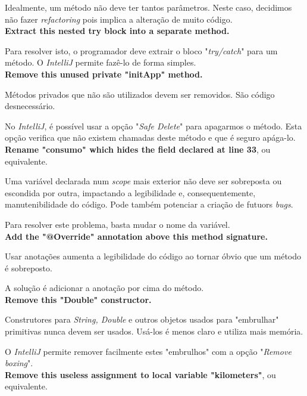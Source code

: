 \documentclass[a4paper]{report}
\begin{document}
\begin{itemize}
    Idealmente, um método não deve ter tantos parâmetros.
    Neste caso, decidimos não fazer \textit{refactoring} pois implica a alteração de muito código. \\
    
    \textbf{Extract this nested try block into a separate method.}
    
    Para resolver isto, o programador deve extrair o bloco "\textit{try/catch}" para um método. O \textit{IntelliJ} permite fazê-lo de forma simples. \\

    
    \textbf{Remove this unused private "initApp" method.}
    
    Métodos privados que não são utilizados devem ser removidos. São código desnecessário.
    
    No \textit{IntelliJ}, é possível usar a opção "\textit{Safe Delete}" para apagarmos o método. Esta opção verifica que não existem chamadas deste método e que é seguro apága-lo. \\
    
    \textbf{Rename "consumo" which hides the field declared at line 33}, ou equivalente.
    
    Uma variável declarada num \textit{scope} mais exterior não deve ser sobreposta ou escondida por outra, impactando a legibilidade e, consequentemente, manutenibilidade do código. Pode também potenciar a criação de futuors \textit{bugs}.
    
    Para resolver este problema, basta mudar o nome da variável.\\
    
    
    \textbf{Add the "@Override" annotation above this method signature.}

    Usar anotações aumenta a legibilidade do código ao tornar óbvio que um método é sobreposto.

    A solução é adicionar a anotação por cima do método. \\


    \textbf{Remove this "Double" constructor.}

    Construtores para \textit{String, Double} e outros objetos usados para "embrulhar" primitivas nunca devem ser usados.
    Usá-los é menos claro e utiliza mais memória.

    O \textit{IntelliJ} permite remover facilmente estes "embrulhos" com a opção "\textit{Remove boxing}". \\


    \textbf{Remove this useless assignment to local variable "kilometers"}, ou equivalente.


\end{itemize}
\end{document}

